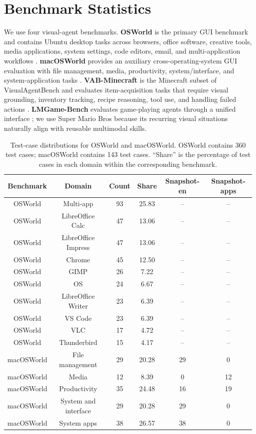 
\section{Benchmark Statistics}
\label{app:benchmark-statistics}

We use four visual-agent benchmarks. \textbf{OSWorld} is the primary GUI benchmark and contains Ubuntu desktop tasks across browsers, office software, creative tools, media applications, system settings, code editors, email, and multi-application workflows \citep{xie2024osworld}. \textbf{macOSWorld} provides an auxiliary cross-operating-system GUI evaluation with file management, media, productivity, system/interface, and system-application tasks \citep{yang2025macosworld}. \textbf{VAB-Minecraft} is the Minecraft subset of VisualAgentBench and evaluates item-acquisition tasks that require visual grounding, inventory tracking, recipe reasoning, tool use, and handling failed actions \citep{liu2024visualagentbench}. \textbf{LMGame-Bench} evaluates game-playing agents through a unified interface \citep{hu2025lmgamebenchgoodllmsplaying}; we use Super Mario Bros because its recurring visual situations naturally align with reusable multimodal skills.

\begin{table}[h]
\centering
\caption{Test-case distributions for OSWorld and macOSWorld. OSWorld contains 360 test cases; macOSWorld contains 143 test cases. ``Share'' is the percentage of test cases in each domain within the corresponding benchmark.}
\label{tab:desktop-test-distribution}
\small
\setlength{\tabcolsep}{5pt}
\begin{tabular}{cccccc}
\toprule
Benchmark & Domain & Count & Share & Snapshot-en & Snapshot-apps \\
\midrule
OSWorld & Multi-app & 93 & 25.83 & -- & -- \\
OSWorld & LibreOffice Calc & 47 & 13.06 & -- & -- \\
OSWorld & LibreOffice Impress & 47 & 13.06 & -- & -- \\
OSWorld & Chrome & 45 & 12.50 & -- & -- \\
OSWorld & GIMP & 26 & 7.22 & -- & -- \\
OSWorld & OS & 24 & 6.67 & -- & -- \\
OSWorld & LibreOffice Writer & 23 & 6.39 & -- & -- \\
OSWorld & VS Code & 23 & 6.39 & -- & -- \\
OSWorld & VLC & 17 & 4.72 & -- & -- \\
OSWorld & Thunderbird & 15 & 4.17 & -- & -- \\
\midrule
macOSWorld & File management & 29 & 20.28 & 29 & 0 \\
macOSWorld & Media & 12 & 8.39 & 0 & 12 \\
macOSWorld & Productivity & 35 & 24.48 & 16 & 19 \\
macOSWorld & System and interface & 29 & 20.28 & 29 & 0 \\
macOSWorld & System apps & 38 & 26.57 & 38 & 0 \\
\bottomrule
\end{tabular}
\end{table}

